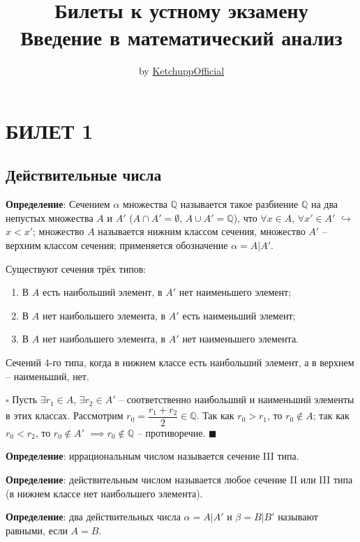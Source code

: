 \documentclass[12pt, a4paper, reqno]{article}
\title{\bf Билеты к устному экзамену \\ Введение в математический анализ}
\date{}
\author{by \href{https://github.com/KetchuppOfficial}{KetchuppOfficial}}
\begin{document}
\maketitle

\newpage
\tableofcontents
\newpage

\section{БИЛЕТ 1}

\subsection{Действительные числа}

    \textbf{Определение}: Сечением $\alpha$ множества $\mathbb{Q}$ называется такое
    разбиение $\mathbb{Q}$ на два непустых множества $A$ и $A'$ ($A \cap A' = \emptyset$,
    $A \cup A' = \mathbb{Q}$), что $\forall x \in A$, $\forall x' \in A'$ $\hookrightarrow$
    $x < x'$; множество $A$ называется нижним классом сечения, множество $A'$ -- верхним
    классом сечения; применяется обозначение $\alpha = A|A'$.

    Существуют сечения трёх типов:
    \begin{enumerate}
        \item В $A$ есть наибольший элемент, в $A'$ нет наименьшего элемент;
        \item В $A$ нет наибольшего элемента, в $A'$ есть наименьший элемент;
        \item В $A$ нет наибольшего элемента, в $A'$ нет наименьшего элемента.
    \end{enumerate}

    Сечений 4-го типа, когда в нижнем классе есть наибольший элемент, а в верхнем -- наименьший, нет.

    $\square$ Пусть $\exists r_1 \in A$, $\exists r_2 \in A'$ -- соответственно наибольший и
    наименьший элементы в этих классах. Рассмотрим $r_0 = \dfrac{r_1 + r_2}{2} \in \mathbb{Q}$. Так
    как $r_0 > r_1$, то $r_0 \not\in A$; так как $r_0 < r_2$, то $r_0 \not\in A'$
    $\implies r_0 \not\in \mathbb{Q}$ -- противоречие. $\blacksquare$

    \textbf{Определение}: иррациональным числом называется сечение III типа.

    \textbf{Определение}: действительным числом называется любое сечение II или III типа (в нижнем
    классе нет наибольшего элемента).

    \textbf{Определение}: два действительных числа $\alpha = A|A'$ и $\beta = B|B'$ называют равными,
    если $A = B$.
\end{document}
